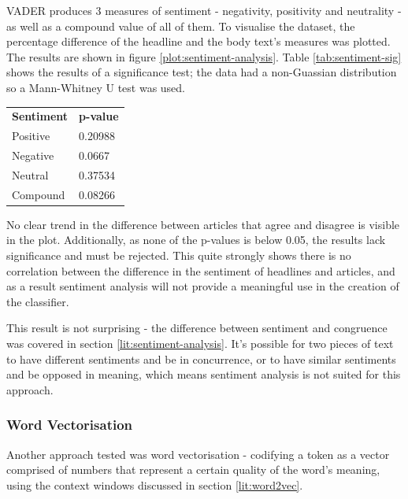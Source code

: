 \vspace{5mm}

\hspace{-6mm}\begin{minipage}{0.65\linewidth}
VADER produces 3 measures of sentiment - negativity, positivity and neutrality - as well as a compound value of all of them. To visualise the dataset, the percentage difference of the headline and the body text's measures was plotted. The results are shown in figure \ref{plot:sentiment-analysis}. Table \ref{tab:sentiment-sig} shows the results of a significance test; the data had a non-Guassian distribution so a Mann-Whitney U test was used.\\
\end{minipage}
\hspace{5mm}
\begin{minipage}{0.3\linewidth}
\vspace{-12mm}
\begin{tabular}{ll}
\textbf{Sentiment} & \textbf{p-value} \\
Positive           & 0.20988          \\
Negative           & 0.0667           \\
Neutral            & 0.37534          \\
Compound           & 0.08266         
\end{tabular}
\label{tab:sentiment-sig}
\end{minipage}


No clear trend in the difference between articles that agree and disagree is visible in the plot. Additionally, as none of the p-values is below 0.05, the results lack significance and must be rejected. This quite strongly shows there is no correlation between the difference in the sentiment of headlines and articles, and as a result sentiment analysis will not provide a meaningful use in the creation of the classifier.

This result is not surprising - the difference between sentiment and congruence was covered in section \ref{lit:sentiment-analysis}. It's possible for two pieces of text to have different sentiments and be in concurrence, or to have similar sentiments and be opposed in meaning, which means sentiment analysis is not suited for this approach.

\subsubsection{Word Vectorisation}
Another approach tested was word vectorisation - codifying a token as a vector comprised of numbers that represent a certain quality of the word's meaning, using the context windows discussed in section \ref{lit:word2vec}.

